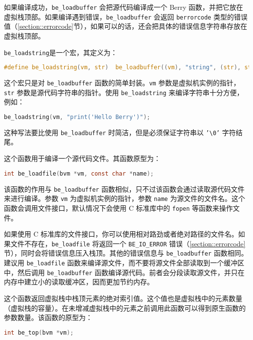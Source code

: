 如果编译成功，\texttt{be\_loadbuffer} 会把源代码编译成一个 Berry 函数，并把它放在虚拟栈顶部。如果编译遇到错误，\texttt{be\_loadbuffer} 会返回 \texttt{berrorcode} 类型的错误值（\ref{section::errorcode}节），如果可以的话，还会把具体的错误信息字符串存放在虚拟栈顶部。


\texttt{be\_loadstring}是一个宏，其定义为：
\begin{lstlisting}[language=c, style=berry, numbers=none]
#define be_loadstring(vm, str)  be_loadbuffer((vm), "string", (str), strlen(str))
\end{lstlisting}
这个宏只是对 \texttt{be\_loadbuffer} 函数的简单封装。\texttt{vm} 参数是虚拟机实例的指针，\texttt{str} 参数是源代码字符串的指针。使用 \texttt{be\_loadstring} 来编译字符串十分方便，例如：
\begin{lstlisting}[language=c, style=berry, numbers=none]
be_loadstring(vm, "print('Hello Berry')");
\end{lstlisting}
这种写法要比使用 \texttt{be\_loadbuffer} 时简洁，但是必须保证字符串以 \texttt{'\textbackslash 0'} 字符结尾。


这个函数用于编译一个源代码文件。其函数原型为：
\begin{lstlisting}[language=c, style=berry, numbers=none]
int be_loadfile(bvm *vm, const char *name);
\end{lstlisting}
该函数的作用与 \texttt{be\_loadbuffer} 函数相似，只不过该函数会通过读取源代码文件来进行编译。参数 \texttt{vm} 为虚拟机实例的指针，参数 \texttt{name} 为源文件的文件名。这个函数会调用文件接口，默认情况下会使用 C 标准库中的 \texttt{fopen} 等函数来操作文件。

如果使用 C 标准库的文件接口，你可以使用相对路劲或者绝对路径的文件名。如果文件不存在，\texttt{be\_loadfile} 将返回一个 \texttt{BE\_IO\_ERROR} 错误（\ref{section::errorcode}节），同时会将错误信息压入栈顶。其他的错误信息与 \texttt{be\_loadbuffer} 函数相同。建议用 \texttt{be\_loadfile} 函数来编译源文件，而不要将源文件全部读取到一个缓冲区中，然后调用 \texttt{be\_loadbuffer} 函数编译源代码。前者会分段读取源文件，并只在内存中建立小的读取缓冲区，因而更加节约内存。


这个函数返回虚拟栈中栈顶元素的绝对索引值。这个值也是虚拟栈中的元素数量（虚拟栈的容量）。在未增减虚拟栈中的元素之前调用此函数可以得到原生函数的参数数量。该函数的原型为：
\begin{lstlisting}[language=c, style=berry, numbers=none]
int be_top(bvm *vm);
\end{lstlisting}

